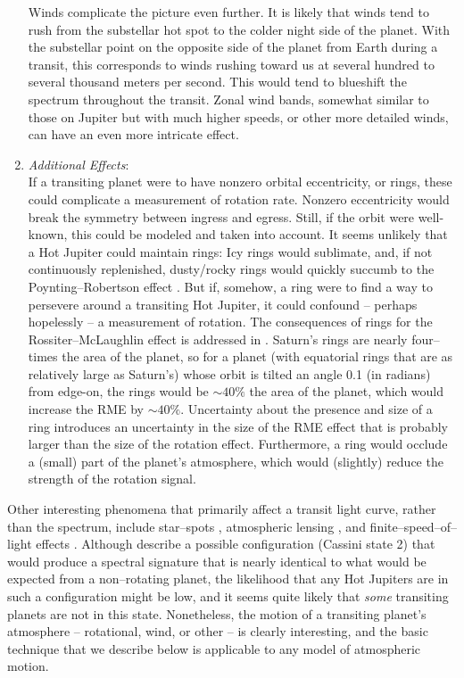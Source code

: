 \documentclass[12pt,preprint]{aastex}
\begin{document}
\begin{enumerate}
Winds complicate the picture even further.  It is likely that winds tend
to rush from the substellar hot spot to the colder night side of the planet.
With the substellar point on the opposite side of the planet from Earth
during a transit, this corresponds to winds rushing toward us at several
hundred to several thousand meters per second.  This would tend to
blueshift the spectrum throughout the transit.  Zonal wind bands, somewhat
similar to those on Jupiter but with much higher speeds, or other more detailed
winds, can have an even more intricate effect.
\item {\it Additional Effects}:\\
If a transiting planet were to have nonzero orbital eccentricity, or rings,
these could complicate a measurement of rotation rate.  Nonzero eccentricity
would break the symmetry between ingress and egress.  Still, if the orbit were
well-known, this could be modeled and taken into account.  It seems unlikely
that a Hot Jupiter could maintain rings: Icy rings would sublimate,
and, if not continuously replenished, dusty/rocky rings would quickly
succumb to the Poynting--Robertson effect \citep{poynting1903,robertson1937}.
But if, somehow, a ring were to find a way to persevere around a transiting
Hot Jupiter, it could confound -- perhaps hopelessly -- a measurement of
rotation.  The consequences of rings for the Rossiter--McLaughlin effect is
addressed in \citet{ohta_et_al2006}.  Saturn's rings are nearly four--times the
area of the planet, so for a planet (with equatorial rings that are as
relatively large as Saturn's) whose orbit is tilted an angle 0.1 (in radians)
from edge-on, the rings would be $\sim 40\%$ the area of the planet, which
would increase the RME by $\sim 40\%$.  Uncertainty about the presence and
size of a ring introduces an uncertainty in the size of the RME effect that is
probably larger than the size of the rotation effect.  Furthermore, a ring
would occlude a (small) part of the planet's atmosphere, which would (slightly)
reduce the strength of the rotation signal.
\end{enumerate}

Other interesting phenomena that primarily affect a transit light curve,
rather than the spectrum, include star--spots \citep{silva2003}, atmospheric
lensing \citep{hui+seager2002}, and finite--speed--of--light effects
\citep{loeb2005}.  Although \citet{winn+holman2005} describe a possible
configuration (Cassini state 2) that would produce a spectral signature
that is nearly identical to what would be expected from a non--rotating
planet, the likelihood that any Hot Jupiters are in such a configuration
might be low, and it seems quite likely that {\it some} transiting
planets are not in this state.  Nonetheless, the motion of a transiting
planet's atmosphere -- rotational, wind, or other -- is clearly interesting,
and the basic technique that we describe below is applicable to any model of
atmospheric motion.
\end{document}
